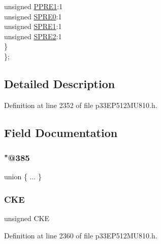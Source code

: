 \begin{DoxyCompactItemize}
\begin{tabbing}
\>\>unsigned \hyperlink{structtag_s_p_i4_c_o_n1_b_i_t_s_aa3b2b2be41d5f1c2cbb3d719899ec64b}{PPRE1}:1\\
\>\>unsigned \hyperlink{structtag_s_p_i4_c_o_n1_b_i_t_s_a36cb065bf6e87533eeb108f0f5383f6c}{SPRE0}:1\\
\>\>unsigned \hyperlink{structtag_s_p_i4_c_o_n1_b_i_t_s_aa10bf0541cfc6de804735f5e3beca089}{SPRE1}:1\\
\>\>unsigned \hyperlink{structtag_s_p_i4_c_o_n1_b_i_t_s_ad98c0587f19b608e8e40e67d2327634c}{SPRE2}:1\\
\>\} \\
\}; \\

\end{tabbing}\end{DoxyCompactItemize}


\subsection{Detailed Description}


Definition at line 2352 of file p33\+E\+P512\+M\+U810.\+h.



\subsection{Field Documentation}
\mbox{\label{structtag_s_p_i4_c_o_n1_b_i_t_s_acc14e8ea1d8fe1e697c4ab876e4b0ba1}} 
\subsubsection{\texorpdfstring{"@385}{@385}}
{\footnotesize\ttfamily union \{ ... \} }

\mbox{\label{structtag_s_p_i4_c_o_n1_b_i_t_s_ad6e30ba11b5574f8a5f548a818b64186}} 
\subsubsection{\texorpdfstring{C\+KE}{CKE}}
{\footnotesize\ttfamily unsigned C\+KE}



Definition at line 2360 of file p33\+E\+P512\+M\+U810.\+h.

